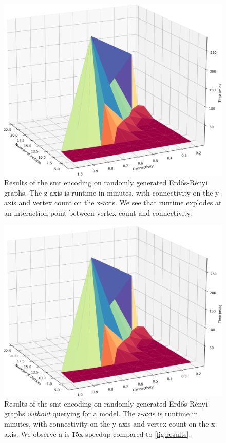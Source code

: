 \label{section:results-and-discussion}
%
\begin{figure}[t]
    \centering
    \includegraphics[width=1\linewidth]{Figures/big_ol_cliff.pdf}
    \caption{Results of the \ac{smt} encoding on randomly generated
      Erd\H{o}s-R\'{e}nyi graphs. The z-axis is runtime in minutes, with
      connectivity on the y-axis and vertex count on the x-axis. We see that
      runtime explodes at an interaction point between vertex count and
      connectivity.}%
    \label{fig:results}
\end{figure}%
%
\begin{figure}[t]
  \centering
  \includegraphics[width=1\linewidth]{Figures/big_ol_cliff.pdf}
  \caption{Results of the \ac{smt} encoding on randomly generated
    Erd\H{o}s-R\'{e}nyi graphs \emph{without} querying for a model. The z-axis
    is runtime in minutes, with connectivity on the y-axis and vertex count on
    the x-axis. We observe a is \~15x speedup compared to
    \autoref{fig:results}.}%
  \label{fig:results-no-model}
\end{figure}%

